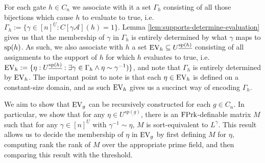 \documentclass[../paper.tex]{subfiles}
\begin{document}
For each gate $h \in C_n$ we associate with it a set $\Gamma_h$ consisting of
all those bijections which cause $h$ to evaluate to true, i.e. $\Gamma_h:=
\{\gamma \in [n]^{\underline{U}} : C[\gamma \mathcal{A}](h) = 1 \}$. Lemma
\ref{lem:supports-determine-evaluation} gives us that the membership of $\gamma$
in $\Gamma_h$ is entirely determined by what $\gamma$ maps to $\text{sp}(h)$. As
such, we also associate with $h$ a set $\text{EV}_h \subseteq
U^{\underline{\text{sp}(h)}}$ consisting of all assignments to the support of $h$
for which $h$ evaluates to true, i.e. $\text{EV}_h := \{ \eta:
U^{\underline{\text{sp}(h)}} : \exists \gamma \in \Gamma_h \wedge \eta \sim
\gamma^{-1})\}$, and note that $\Gamma_h$ is entirely determined by $\text{EV}_h$. The
important point to note is that each $\eta \in \text{EV}_h$ is defined on a
constant-size domain, and as such $\text{EV}_h$ gives us a succinct way of encoding
$\Gamma_h$.

We aim to show that $\text{EV}_g$ can be recursively constructed for each $g \in C_n$.
In particular, we show that for any $\eta \in U^{\underline{sp(g)}}$, there is
an $\text{\upshape FPrk}$-definable matrix $M$ such that for any $\gamma \in
[n]^{\underline{U}}$ with $\gamma^{-1} \sim \eta$, $M$ is sort-equivalent to
$L^{\gamma}$. This result allows us to decide the membership of $\eta$ in
$\text{EV}_g$ by first defining $M$ for $\eta$, computing rank the rank of $M$ over
the appropriate prime field, and then comparing this result with the threshold.








\end{document}
